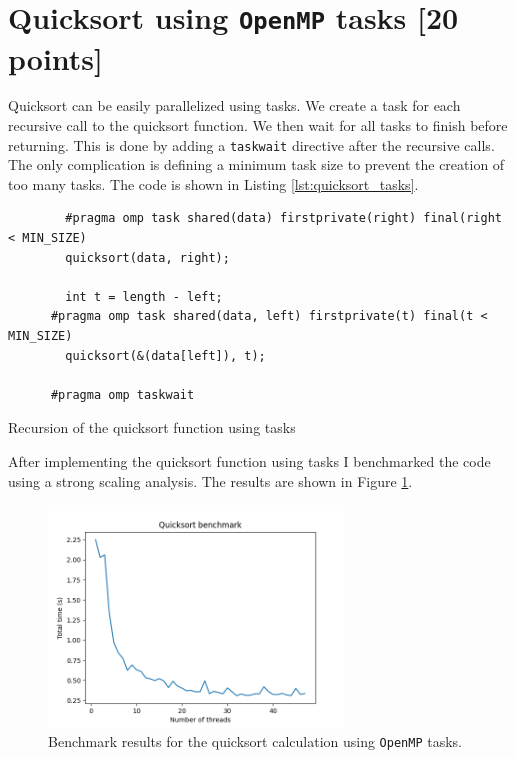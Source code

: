 \documentclass[unicode,11pt,a4paper,oneside,numbers=endperiod,openany]{scrartcl}
\begin{document}
\section{Quicksort using \texttt{OpenMP} tasks [20 points]}

Quicksort can be easily parallelized using tasks. We create a task for each recursive call to the quicksort function. We then wait for all tasks to finish before returning. This is done by adding a \texttt{taskwait} directive after the recursive calls. The only complication is defining a minimum task size to prevent the creation of too many tasks. The code is shown in Listing \ref{lst:quicksort_tasks}.

\begin{listing}[h!t]
    \begin{verbatim}
        #pragma omp task shared(data) firstprivate(right) final(right < MIN_SIZE)
        quicksort(data, right);
      
        int t = length - left;
      #pragma omp task shared(data, left) firstprivate(t) final(t < MIN_SIZE)
        quicksort(&(data[left]), t);
      
      #pragma omp taskwait
    \end{verbatim}
    \caption{Recursion of the quicksort function using tasks}
    \label{lst:quicksort_tasks}
\end{listing}

After implementing the quicksort function using tasks I benchmarked the code using a strong scaling analysis. The results are shown in Figure \ref{fig:quicksort_benchmark}.

\begin{figure}[h]
    \centering
    \includegraphics[width=0.7\textwidth]{../code/quicksort/benchmark.png}
    \caption{Benchmark results for the quicksort calculation using \texttt{OpenMP} tasks.}
    \label{fig:quicksort_benchmark}
\end{figure}
\end{document}
